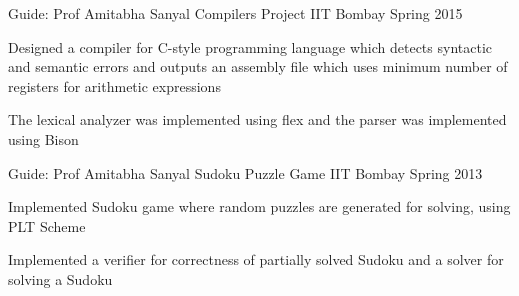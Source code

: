 \begin{cventries}
{      %
    }
    \cventry
    {Guide: Prof Amitabha Sanyal}
    {Compilers Project}
    {IIT Bombay}
    {Spring 2015}
    {
      \begin{cvitems}
        \item {Designed a compiler for C-style programming language which detects syntactic and semantic errors and
            outputs an assembly file which uses minimum number of registers for arithmetic expressions}
        \item{The lexical analyzer was implemented using flex and the parser was implemented using Bison}
      \end{cvitems}
    }
    
    \cventry
    {Guide: Prof Amitabha Sanyal}
    {Sudoku Puzzle Game}
    {IIT Bombay}
    {Spring 2013}
    {
      \begin{cvitems}
        \item {Implemented Sudoku game where random puzzles are generated for solving, using PLT Scheme}
        \item{Implemented a verifier for correctness of partially solved Sudoku and a solver for solving a Sudoku}
      \end{cvitems}
    }
    
    
\end{cventries}
